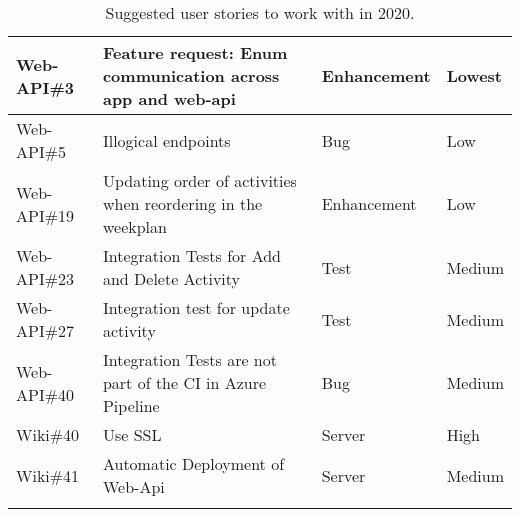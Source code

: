 \begin{longtable}{|p{2.9cm}|p{7cm}|p{1.4cm}|p{1.5cm}|}
    Web-API\#3       & Feature request: Enum communication across app and web-api                                                                                                                & Enhancement & Lowest  \\ \hline
    Web-API\#5       & Illogical endpoints                                                                                                                                                       & Bug & Low  \\ \hline
    Web-API\#19      & Updating order of activities when reordering in the weekplan                                                                                                              & Enhancement & Low  \\ \hline
    Web-API\#23      & Integration Tests for Add and Delete Activity                                                                                                                             & Test & Medium  \\ \hline
    Web-API\#27      & Integration test for update activity                                                                                                                                      & Test & Medium  \\ \hline
    Web-API\#40      & Integration Tests are not part of the CI in Azure Pipeline                                                                                                                & Bug & Medium   \\ \hline
    Wiki\#40         & Use SSL                                                                                                                                                                   & Server     & High  \\ \hline
    Wiki\#41         & Automatic Deployment of Web-Api                                                                                                                                           & Server     & Medium     \\ \hline  
    \caption{Suggested user stories to work with in 2020.}
\end{longtable}

